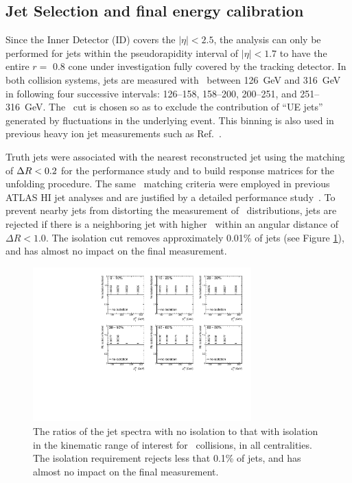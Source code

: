 \subsection{Jet Selection and final energy calibration}
\label{Sec:JetSelection}
Since the Inner Detector (ID) covers the $|\eta| < 2.5$, the analysis can only be performed for jets within the pseudorapidity interval of $|\eta| < 1.7$ to have the entire $ r = $ 0.8 cone under investigation fully covered by the tracking detector.
In both collision systems, jets are measured with \ptjet\ between 126~GeV and 316~GeV in following four successive intervals: 126--158, 158--200, 200--251, and 251--316~GeV.
The \ptjet\ cut is chosen so as to exclude the contribution of ``UE jets'' generated by fluctuations in the underlying event.
This binning is also used in previous heavy ion jet measurements such as Ref.~\cite{PhysRevC.98.024908}.

Truth jets were associated with the nearest reconstructed jet using the matching of $\mbox{$\Delta R$}<0.2$ for the performance study and to build response matrices for the unfolding procedure.
The same \dR\ matching criteria were employed in previous ATLAS HI jet analyses and are justified by a detailed performance study~\cite{ATLAS-COM-PHYS-2011-1733}.
To prevent nearby jets from distorting the measurement of \Dptr\ distributions, jets are rejected if there is a neighboring jet with higher \ptjet\ within an angular distance of $\Delta R < 1.0$.
The isolation cut removes approximately 0.01\% of jets (see Figure \ref{fig:ISO}), and has almost no impact on the final measurement.

\begin{figure}
\centering
\includegraphics[width=0.75\textwidth]{figures/main/performance/jet_iso.pdf}
\caption{The ratios of the jet spectra with no isolation to that with isolation in the kinematic range of interest for \pbpb\ collisions, in all centralities.
The isolation requirement rejects less that 0.1\% of jets, and has almost no impact on the final measurement.}
\label{fig:ISO}
\end{figure}  

